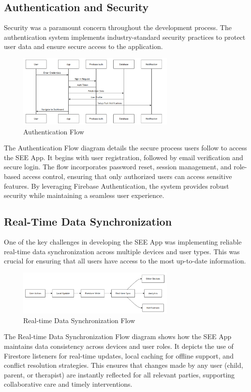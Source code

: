 ﻿\documentclass[12pt,a4paper]{article}
\newcommand{\sectiontitle}[1]{\subsection{#1}}
\begin{document}
\sectiontitle{Authentication and Security}

Security was a paramount concern throughout the development process. The authentication system implements industry-standard security practices to protect user data and ensure secure access to the application.

\begin{figure}[H]
    \centering
    \includegraphics[width=0.7\textwidth,height=0.32\textwidth,keepaspectratio]{redrawn_diagrams/Figure2_Authentication_Flow.png}
    \caption{Authentication Flow}
    \label{fig:auth-flow}
\end{figure}
\vspace{0.5em}
The Authentication Flow diagram details the secure process users follow to access the SEE App. It begins with user registration, followed by email verification and secure login. The flow incorporates password reset, session management, and role-based access control, ensuring that only authorized users can access sensitive features. By leveraging Firebase Authentication, the system provides robust security while maintaining a seamless user experience.

\sectiontitle{Real-Time Data Synchronization}

One of the key challenges in developing the SEE App was implementing reliable real-time data synchronization across multiple devices and user types. This was crucial for ensuring that all users have access to the most up-to-date information.

\begin{figure}[H]
    \centering
    \includegraphics[width=0.7\textwidth,height=0.2\textwidth,keepaspectratio]{redrawn_diagrams/Figure3_Real_time_Data_Sync.png}
    \caption{Real-time Data Synchronization Flow}
    \label{fig:data-sync}
\end{figure}
\vspace{0.5em}
The Real-time Data Synchronization Flow diagram shows how the SEE App maintains data consistency across devices and user roles. It depicts the use of Firestore listeners for real-time updates, local caching for offline support, and conflict resolution strategies. This ensures that changes made by any user (child, parent, or therapist) are instantly reflected for all relevant parties, supporting collaborative care and timely interventions.
\end{document}
